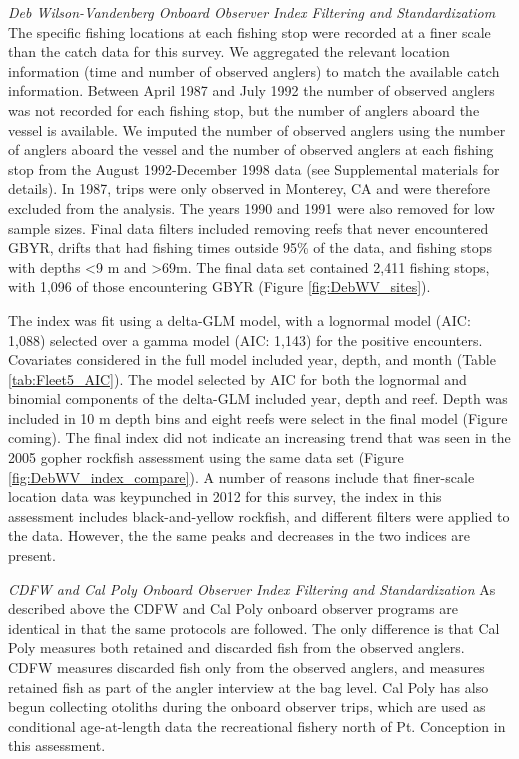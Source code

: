 \documentclass[12pt,]{article}
\begin{document}
\emph{Deb Wilson-Vandenberg Onboard Observer Index Filtering and
Standardizatiom} The specific fishing locations at each fishing stop
were recorded at a finer scale than the catch data for this survey. We
aggregated the relevant location information (time and number of
observed anglers) to match the available catch information. Between
April 1987 and July 1992 the number of observed anglers was not recorded
for each fishing stop, but the number of anglers aboard the vessel is
available. We imputed the number of observed anglers using the number of
anglers aboard the vessel and the number of observed anglers at each
fishing stop from the August 1992-December 1998 data (see Supplemental
materials for details). In 1987, trips were only observed in Monterey,
CA and were therefore excluded from the analysis. The years 1990 and
1991 were also removed for low sample sizes. Final data filters included
removing reefs that never encountered GBYR, drifts that had fishing
times outside 95\% of the data, and fishing stops with depths
\textless{}9 m and \textgreater{}69m. The final data set contained 2,411
fishing stops, with 1,096 of those encountering GBYR (Figure
\ref{fig:DebWV_sites}).

The index was fit using a delta-GLM model, with a lognormal model (AIC:
1,088) selected over a gamma model (AIC: 1,143) for the positive
encounters. Covariates considered in the full model included year,
depth, and month (Table \ref{tab:Fleet5_AIC}). The model selected by AIC
for both the lognormal and binomial components of the delta-GLM included
year, depth and reef. Depth was included in 10 m depth bins and eight
reefs were select in the final model (Figure coming). The final index
did not indicate an increasing trend that was seen in the 2005 gopher
rockfish assessment using the same data set (Figure
\ref{fig:DebWV_index_compare}). A number of reasons include that
finer-scale location data was keypunched in 2012 for this survey, the
index in this assessment includes black-and-yellow rockfish, and
different filters were applied to the data. However, the the same peaks
and decreases in the two indices are present.

\emph{CDFW and Cal Poly Onboard Observer Index Filtering and
Standardization} As described above the CDFW and Cal Poly onboard
observer programs are identical in that the same protocols are followed.
The only difference is that Cal Poly measures both retained and
discarded fish from the observed anglers. CDFW measures discarded fish
only from the observed anglers, and measures retained fish as part of
the angler interview at the bag level. Cal Poly has also begun
collecting otoliths during the onboard observer trips, which are used as
conditional age-at-length data the recreational fishery north of Pt.
Conception in this assessment.
\end{document}
